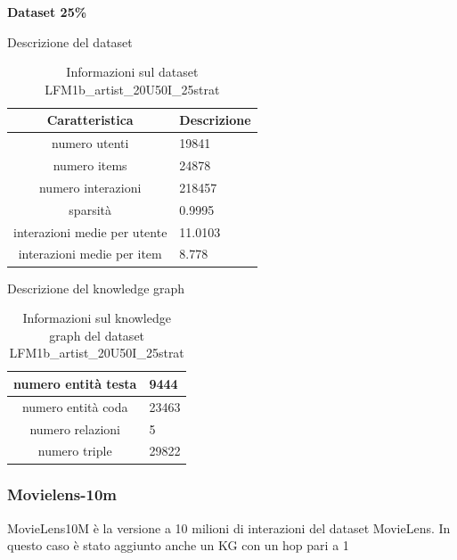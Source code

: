 \noindent\textbf{Dataset 25\%}

\noindent Descrizione del dataset
\begin{table}[H]
    \centering
    \footnotesize
    \begin{tabularx}{\textwidth}{|c|X|}
        \hline
        \textbf{Caratteristica} & \textbf{Descrizione} \\
        \hline
        numero utenti & 19841 \\
        \hline
        numero items & 24878 \\
        \hline
        numero interazioni & 218457 \\
        \hline
        sparsità & 0.9995 \\
        \hline
        interazioni medie per utente & 11.0103 \\
        \hline
        interazioni medie per item & 8.778 \\
        \hline
    \end{tabularx}
    \caption{Informazioni sul dataset LFM1b\_artist\_20U50I\_25strat}
    \label{tab:dataset_info}
\end{table}


\noindent Descrizione del knowledge graph
\begin{table}[H]
    \centering
    \footnotesize
    \begin{tabularx}{\textwidth}{|c|X|}
        \hline
        numero entità testa & 9444 \\
        \hline
        numero entità coda & 23463 \\
        \hline
        numero relazioni & 5 \\
        \hline
        numero triple & 29822 \\
        \hline
    \end{tabularx}
    \caption{Informazioni sul knowledge graph del dataset LFM1b\_artist\_20U50I\_25strat}
    \label{tab:dataset_info}
\end{table}

\subsubsection{Movielens-10m}
\noindent MovieLens10M è la versione a 10 milioni di interazioni del dataset MovieLens. In questo caso è stato aggiunto anche un KG con un hop pari a 1

